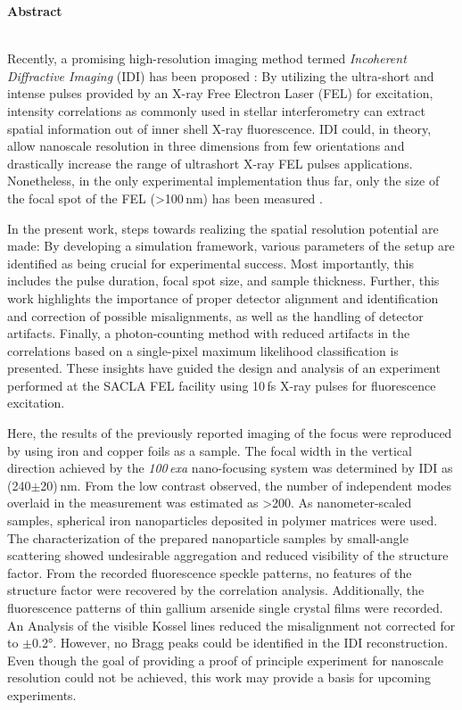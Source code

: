 	\begin{Huge}
		\textbf{Abstract}\vspace{12mm}
	\end{Huge}
\\
Recently, a promising high-resolution imaging method termed \textit{Incoherent Diffractive Imaging} (IDI) has been proposed \cite{classen2017}: By utilizing the ultra-short and intense pulses provided by an X-ray Free Electron Laser (FEL) for excitation,  intensity correlations as commonly used in stellar interferometry can extract spatial information out of inner shell X-ray fluorescence.  
IDI could, in theory, allow nanoscale resolution in three dimensions from few orientations and drastically increase the range of ultrashort X-ray FEL pulses applications. Nonetheless, in the only experimental implementation thus far, only the size of the focal spot of the FEL (>100\,nm) has been measured \cite{nakumura2020}.

In the present work, steps towards realizing the spatial resolution potential are made: By developing a simulation framework, various parameters of the setup are identified as being crucial for experimental success. Most importantly, this includes the pulse duration, focal spot size, and sample thickness. Further, this work highlights the importance of proper detector alignment and identification and correction of possible misalignments, as well as the handling of detector artifacts. Finally, a photon-counting method with reduced artifacts in the correlations based on a single-pixel maximum likelihood classification is presented. These insights have guided the design and analysis of an experiment performed at the SACLA FEL facility using 10\,fs X-ray pulses for fluorescence excitation.

Here, the results of the previously reported imaging of the focus were reproduced by using iron and copper foils as a sample. The focal width in the vertical direction achieved by the \textit{100\,exa} nano-focusing system was determined by IDI  as (240$\pm$20)\,nm. From the low contrast observed, the number of independent modes overlaid in the measurement was estimated as >200.  As nanometer-scaled samples, spherical iron nanoparticles deposited in polymer matrices were used. The characterization of the prepared nanoparticle samples by small-angle scattering showed undesirable aggregation and reduced visibility of the structure factor.  From the recorded fluorescence speckle patterns, no features of the structure factor were recovered by the correlation analysis.  Additionally, the fluorescence patterns of thin gallium arsenide single crystal films were recorded.  An Analysis of the visible Kossel lines reduced the misalignment not corrected for to $\pm$0.2°. However, no Bragg peaks could be identified in the IDI reconstruction.
Even though the goal of providing a proof of principle experiment for nanoscale resolution could not be achieved, this work may provide a basis for upcoming experiments.





